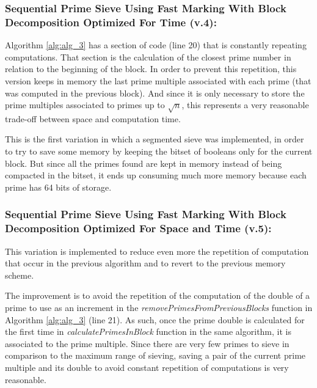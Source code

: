 \documentclass[runningheads,a4paper]{llncs}
\begin{document}
\subsubsection{Sequential Prime Sieve Using Fast Marking With Block Decomposition Optimized For Time (v.4):}
\label{Sequential Prime Sieve Using Fast Marking With Block Decomposition Optimized For Time}

Algorithm \ref{alg:alg_3} has a section of code (line 20) that is constantly repeating computations. That section is the calculation of the closest prime number in relation to the beginning of the block. In order to prevent this repetition, this version keeps in memory the last prime multiple associated with each prime (that was computed in the previous block). And since it is only necessary to store the prime multiples associated to primes up to $\sqrt{n}$, this represents a very reasonable trade-off between space and computation time. 

This is the first variation in which a segmented sieve was implemented, in order to try to save some memory by keeping the bitset of booleans only for the current block. But since all the primes found are kept in memory instead of being compacted in the bitset, it ends up consuming much more memory because each prime has 64 bits of storage.


\subsubsection{Sequential Prime Sieve Using Fast Marking With Block Decomposition Optimized For Space and Time (v.5):}
\label{Sequential Prime Sieve Using Fast Marking With Block Decomposition Optimized For Space and Time}

This variation is implemented to reduce even more the repetition of computation that occur in the previous algorithm and to revert to the previous memory scheme.

The improvement is to avoid the repetition of the computation of the double of a prime to use as an increment in the \mbox{\textit{removePrimesFromPreviousBlocks}} function in Algorithm \ref{alg:alg_3} (line 21). As such, once the prime double is calculated for the first time in \mbox{\textit{calculatePrimesInBlock}} function in the same algorithm, it is associated to the prime multiple. Since there are very few primes to sieve in comparison to the maximum range of sieving, saving a pair of the current prime multiple and its double to avoid constant repetition of computations is very reasonable.
\end{document}
